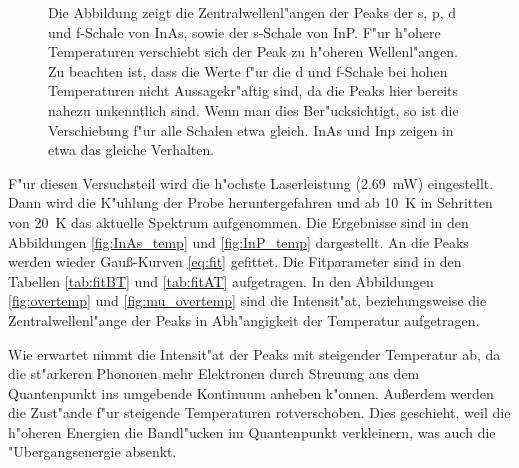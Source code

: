 \begin{figure}[htbp]
    \centering
    
    \caption{
        Die Abbildung zeigt die Zentralwellenl"angen der Peaks der s, p, d und f-Schale von InAs, sowie der s-Schale von InP.
        F"ur h"ohere Temperaturen verschiebt sich der Peak zu h"oheren Wellenl"angen.
        Zu beachten ist, dass die Werte f"ur die d und f-Schale bei hohen Temperaturen nicht Aussagekr"aftig sind, da die Peaks hier bereits nahezu unkenntlich sind.
        Wenn man dies Ber"ucksichtigt, so ist die Verschiebung f"ur alle Schalen etwa gleich.
        InAs und Inp zeigen in etwa das gleiche Verhalten.
    }
    \label{fig:mu_overtemp}
\end{figure}
F"ur diesen Versuchsteil wird die h"ochste Laserleistung (\SI{2.69}{\milli\watt}) eingestellt.
Dann wird die K"uhlung der Probe heruntergefahren und ab \SI{10}{\kelvin} in Schritten von \SI{20}{\kelvin} das aktuelle Spektrum aufgenommen.
Die Ergebnisse sind in den Abbildungen \vref{fig:InAs_temp} und \vref{fig:InP_temp} dargestellt.
An die Peaks werden wieder Gau\ss-Kurven \eqref{eq:fit} gefittet.
Die Fitparameter sind in den Tabellen \vref{tab:fitBT} und \vref{tab:fitAT} aufgetragen.
In den Abbildungen \vref{fig:overtemp} und \vref{fig:mu_overtemp} sind die Intensit"at, beziehungsweise die Zentralwellenl"ange der Peaks in Abh"angigkeit der Temperatur aufgetragen.

Wie erwartet nimmt die Intensit"at der Peaks mit steigender Temperatur ab, da die st"arkeren Phononen mehr Elektronen durch Streuung aus dem Quantenpunkt ins umgebende Kontinuum anheben k"onnen.
Au{\ss}erdem werden die Zust"ande f"ur steigende Temperaturen rotverschoben.
Dies geschieht, weil die h"oheren Energien die Bandl"ucken im Quantenpunkt verkleinern, was auch die "Ubergangsenergie absenkt.

